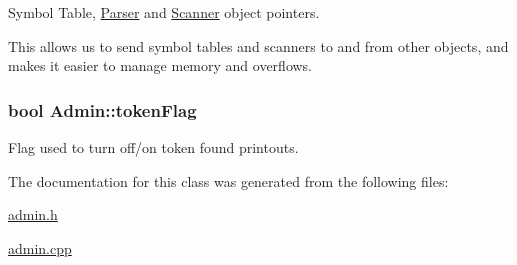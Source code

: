 Symbol Table, \hyperlink{classParser}{Parser} and \hyperlink{classScanner}{Scanner} object pointers. 

This allows us to send symbol tables and scanners to and from other objects, and makes it easier to manage memory and overflows. \hypertarget{classAdmin_a7160b27f8f1cf8d4e526cc6e54ee8031}{
\subsubsection[{tokenFlag}]{\setlength{\rightskip}{0pt plus 5cm}bool {\bf Admin::tokenFlag}}}
\label{classAdmin_a7160b27f8f1cf8d4e526cc6e54ee8031}


Flag used to turn off/on token found printouts. 



The documentation for this class was generated from the following files:\begin{DoxyCompactItemize}
\item 
\hyperlink{admin_8h}{admin.h}\item 
\hyperlink{admin_8cpp}{admin.cpp}\end{DoxyCompactItemize}
